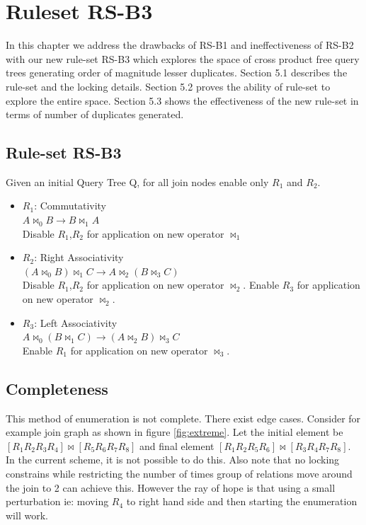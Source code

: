 \chapter{Ruleset RS-B3}
In this chapter we address the drawbacks of RS-B1 and ineffectiveness of RS-B2 with our new rule-set RS-B3 which explores the space of cross product free query trees generating order of magnitude lesser duplicates. Section 5.1 describes the rule-set and the locking details. Section 5.2 proves the ability of rule-set to explore the entire space. Section 5.3 shows the effectiveness of the new rule-set in terms of number of duplicates generated. 
  
\section{Rule-set RS-B3}
Given an initial Query Tree Q, for all join nodes enable only $R_{1}$ and $R_{2}$.

\begin{itemize}
	\item $R_{1}$: Commutativity \\ $A \bowtie_{0} B \rightarrow B \bowtie_{1} A$ \\
	Disable $R_{1}$,$R_{2}$ for application on new operator $\bowtie_{1}$
	\item $R_{2}$: Right Associativity \\ $(A \bowtie_{0} B) \bowtie_{1} C \rightarrow A \bowtie_{2} (B \bowtie_{3} C)$ \\
	Disable $R_{1}$,$R_{2}$ for application on new operator $\bowtie_{2}$. Enable $R_{3}$ for application on new operator $\bowtie_{2}$.		
	\item $R_{3}$: Left Associativity \\ $A \bowtie_{0} (B \bowtie_{1} C) \rightarrow (A \bowtie_{2} B) \bowtie_{3} C$ \\
	Enable $R_{1}$ for application on new operator $\bowtie_{3}$.
\end{itemize}

\section{Completeness}
This method of enumeration is not complete. There exist edge cases. Consider for example join graph as shown in figure \ref{fig:extreme}. Let the initial element be $[R_{1}R_{2}R_{3}R_{4}]\bowtie[R_{5}R_{6}R_{7}R_{8}]$ and final element $[R_{1}R_{2}R_{5}R_{6}]\bowtie[R_{3}R_{4}R_{7}R_{8}]$. In the current scheme, it is not possible to do this. Also note that no locking constrains while restricting the number of times group of relations move around the join to 2 can achieve this. However the ray of hope is that using a small perturbation ie: moving $R_{4}$ to right hand side and then starting the enumeration will work. \\


